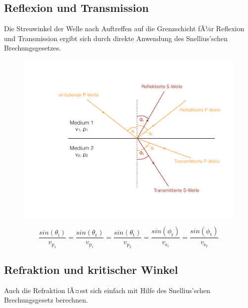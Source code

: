 \subsection{Reflexion und Transmission}
Die Streuwinkel der Welle nach Auftreffen auf die Grenzschicht fÃ¼r Reflexion und Transmission ergibt sich durch direkte Anwendung des Snellius'schen Brechungsgesetzes.

\begin{figure}[H]
	\centering
	\includegraphics[width = \textwidth]{SeismikBilder/ReflexionTransmission}
\end{figure}

\begin{equation*}
	\frac{sin(\theta_{\text{i}})}{v_{\text{p}_1}} = \frac{sin(\theta_{\text{r}})}{v_{\text{p}_1}} = \frac{sin(\theta_{\text{t}})}{v_{\text{p}_2}} = \frac{sin(\phi_{\text{r}})}{v_{\text{s}_1}} = \frac{sin(\phi_{\text{t}})}{v_{\text{s}_2}}
\end{equation*}


\subsection{Refraktion und kritischer Winkel}
Auch die Refraktion lÃ¤sst sich einfach mit Hilfe des Snellius'schen Brechungsgesetz berechnen.

